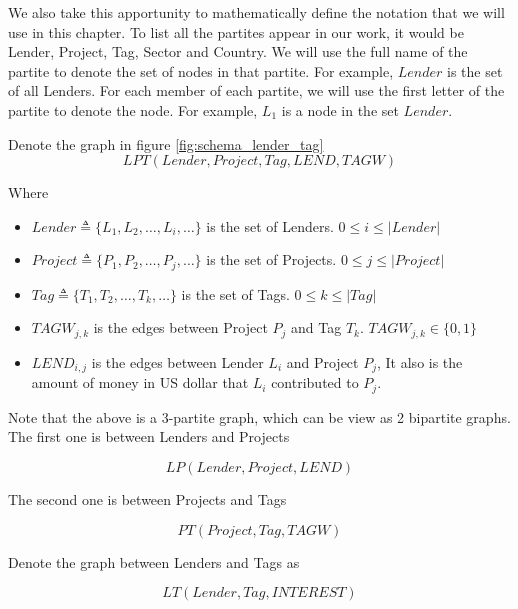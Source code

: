 We also take this apportunity to mathematically define the notation that we will use in this chapter.
To list all the partites appear in our work, it would be Lender, Project, Tag, Sector and Country.
We will use the full name of the partite to denote the set of nodes in that partite.
For example, $Lender$ is the set of all Lenders.
For each member of each partite, we will use the first letter of the partite to denote the node.
For example, $L_1$ is a node in the set $Lender$.

Denote the graph in figure \ref{fig:schema_lender_tag}
\begin{equation}
	LPT(Lender, Project, Tag, LEND, TAGW)
\end{equation}

Where

\begin{itemize}
	\item $Lender \triangleq \{L_1, L_2, \ldots, L_i,\ldots \}$ is the set of Lenders. $0 \le i \le |Lender|$
	\item $Project \triangleq \{P_1, P_2, \ldots, P_j,\ldots \}$ is the set of Projects. $0 \le j \le |Project|$
	\item $Tag \triangleq \{T_1, T_2, \ldots, T_k,\ldots \}$ is the set of Tags. $0\le k \le |Tag|$
	\item $TAGW_{j,k}$ is the edges between Project $P_j$ and Tag $T_k$. $TAGW_{j,k} \in \{0, 1\}$
	\item $LEND_{i,j}$ is the edges between Lender $L_i$ and Project $P_j$,
	      It also is the amount of money in US dollar that $L_i$ contributed to $P_j$.
\end{itemize}

Note that the above is a 3-partite graph, which can be view as 2 bipartite graphs.
The first one is between Lenders and Projects

\begin{equation}
	LP(Lender, Project, LEND)
\end{equation}

The second one is between Projects and Tags

\begin{equation}
	PT(Project, Tag, TAGW)
\end{equation}

Denote the graph between Lenders and Tags as

\begin{equation}
	LT(Lender, Tag, INTEREST)
\end{equation}

